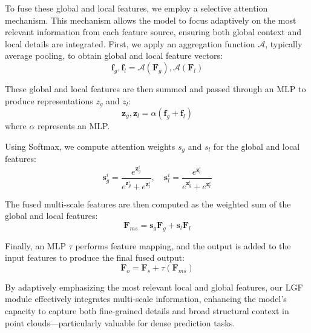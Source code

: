 To fuse these global and local features, we employ a selective attention mechanism. This mechanism allows the model to focus adaptively on the most relevant information from each feature source, ensuring both global context and local details are integrated. First, we apply an aggregation function $\mathcal{A}$, typically average pooling, to obtain global and local feature vectors:
\begin{equation}
	\boldsymbol{f}_g, \boldsymbol{f}_l = \mathcal{A}(\boldsymbol{F}_g),  \mathcal{A}(\boldsymbol{F}_l)
\end{equation}

These global and local features are then summed and passed through an MLP to produce representations $z_g$ and $z_l$:
\begin{equation}
	\boldsymbol{z}_g, \boldsymbol{z}_l = \alpha \left( \boldsymbol{f}_g + \boldsymbol{f}_l \right)
\end{equation}
where $\alpha$ represents an MLP.

Using Softmax, we compute attention weights $s_g$ and $s_l$ for the global and local features:
\begin{equation}
	\boldsymbol{s}_g^i = \frac{e^{\boldsymbol{z}_g^i}}{e^{\boldsymbol{z}_g^i} + e^{\boldsymbol{z}_l^i}}, \quad \boldsymbol{s}_l^i = \frac{e^{\boldsymbol{z}_l^i}}{e^{\boldsymbol{z}_g^i} + e^{\boldsymbol{z}_l^i}}
\end{equation}

The fused multi-scale features are then computed as the weighted sum of the global and local features:
\begin{equation}
	\boldsymbol{F}_{ms} = \boldsymbol{s}_g \boldsymbol{F}_g + \boldsymbol{s}_l \boldsymbol{F}_l
\end{equation}

Finally, an MLP $\tau$ performs feature mapping, and the output is added to the input features to produce the final fused output:
\begin{equation}
	\boldsymbol{F}_{o} = \boldsymbol{F}_s + \tau \left( \boldsymbol{F}_{ms} \right)
\end{equation}

By adaptively emphasizing the most relevant local and global features, our LGF module effectively integrates multi-scale information, enhancing the model's capacity to capture both fine-grained details and broad structural context in point clouds—particularly valuable for dense prediction tasks.

